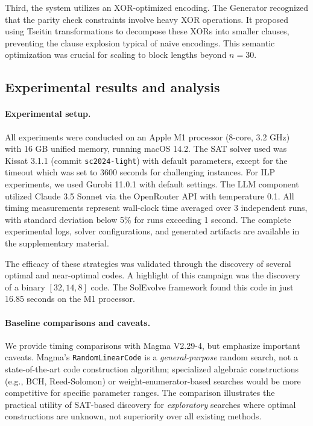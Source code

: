 Third, the system utilizes an XOR-optimized encoding. The Generator recognized that the parity check constraints involve heavy XOR operations. It proposed using Tseitin transformations to decompose these XORs into smaller clauses, preventing the clause explosion typical of naive encodings. This semantic optimization was crucial for scaling to block lengths beyond $n=30$.

\subsection{Experimental results and analysis}

\paragraph{Experimental setup.} All experiments were conducted on an Apple M1 processor (8-core, 3.2 GHz) with 16 GB unified memory, running macOS 14.2. The SAT solver used was Kissat 3.1.1 (commit \texttt{sc2024-light}) with default parameters, except for the timeout which was set to 3600 seconds for challenging instances. For ILP experiments, we used Gurobi 11.0.1 with default settings. The LLM component utilized Claude 3.5 Sonnet via the OpenRouter API with temperature 0.1. All timing measurements represent wall-clock time averaged over 3 independent runs, with standard deviation below 5\% for runs exceeding 1 second. The complete experimental logs, solver configurations, and generated artifacts are available in the supplementary material.

The efficacy of these strategies was validated through the discovery of several optimal and near-optimal codes. A highlight of this campaign was the discovery of a binary $[32,14,8]$ code. The SolEvolve framework found this code in just 16.85 seconds on the M1 processor.

\paragraph{Baseline comparisons and caveats.} We provide timing comparisons with Magma V2.29-4, but emphasize important caveats. Magma's \texttt{RandomLinearCode} is a \textit{general-purpose} random search, not a state-of-the-art code construction algorithm; specialized algebraic constructions (e.g., BCH, Reed-Solomon) or weight-enumerator-based searches would be more competitive for specific parameter ranges. The comparison illustrates the practical utility of SAT-based discovery for \textit{exploratory} searches where optimal constructions are unknown, not superiority over all existing methods.

